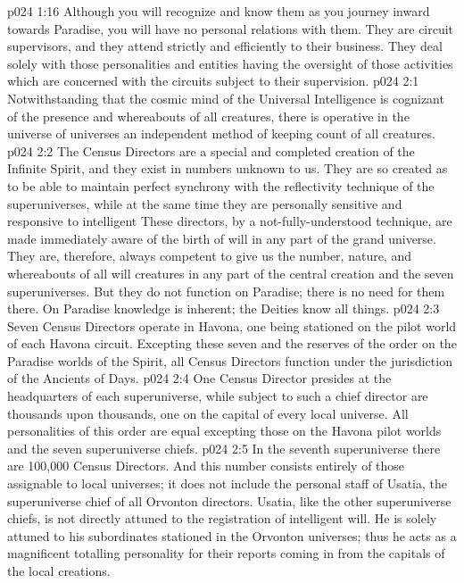 \vs p024 1:16 Although you will recognize and know them as you journey inward towards Paradise, you will have no personal relations with them. They are circuit supervisors, and they attend strictly and efficiently to their business. They deal solely with those personalities and entities having the oversight of those activities which are concerned with the circuits subject to their supervision.
\vs p024 2:1 Notwithstanding that the cosmic mind of the Universal Intelligence is cognizant of the presence and whereabouts of all  creatures, there is operative in the universe of universes an independent method of keeping count of all  creatures.
\vs p024 2:2 The Census Directors are a special and completed creation of the Infinite Spirit, and they exist in numbers unknown to us. They are so created as to be able to maintain perfect synchrony with the reflectivity technique of the superuniverses, while at the same time they are personally sensitive and responsive to intelligent  These directors, by a not\hyp{}fully\hyp{}understood technique, are made immediately aware of the birth of will in any part of the grand universe. They are, therefore, always competent to give us the number, nature, and whereabouts of all will creatures in any part of the central creation and the seven superuniverses. But they do not function on Paradise; there is no need for them there. On Paradise knowledge is inherent; the Deities know all things.
\vs p024 2:3 \pc Seven Census Directors operate in Havona, one being stationed on the pilot world of each Havona circuit. Excepting these seven and the reserves of the order on the Paradise worlds of the Spirit, all Census Directors function under the jurisdiction of the Ancients of Days.
\vs p024 2:4 One Census Director presides at the headquarters of each superuniverse, while subject to such a chief director are thousands upon thousands, one on the capital of every local universe. All personalities of this order are equal excepting those on the Havona pilot worlds and the seven superuniverse chiefs.
\vs p024 2:5 In the seventh superuniverse there are 100,000 Census Directors. And this number consists entirely of those assignable to local universes; it does not include the personal staff of Usatia, the superuniverse chief of all Orvonton directors. Usatia, like the other superuniverse chiefs, is not directly attuned to the registration of intelligent will. He is solely attuned to his subordinates stationed in the Orvonton universes; thus he acts as a magnificent totalling personality for their reports coming in from the capitals of the local creations.
